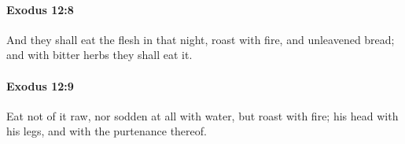 		\paragraph{Exodus 12:8} %
			\label{EXODUS-12-8}

			And they shall eat the flesh in that night, roast with fire, and unleavened bread; and with bitter herbs they shall eat it.


		\paragraph{Exodus 12:9} %
			\label{EXODUS-12-9}

			Eat not of it raw, nor sodden at all with water, but roast with fire; his head with his legs, and with the purtenance thereof.


